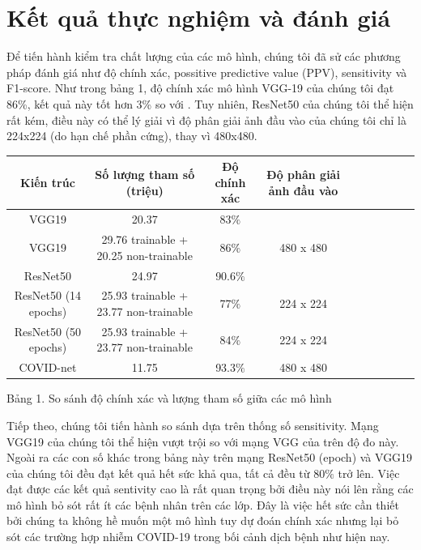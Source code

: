 \documentclass{article}
\begin{document}
\section{Kết quả thực nghiệm và đánh giá}
Để tiến hành kiểm tra chất lượng của các mô hình, chúng tôi đã sử các phương pháp đánh giá như độ chính xác, possitive predictive value (PPV), sensitivity và F1-score. Như trong bảng 1, độ chính xác mô hình VGG-19 của chúng tôi đạt 86\%, kết quả này tốt hơn 3\% so với \cite{covidxdataset}. Tuy nhiên, ResNet50 của chúng tôi thể hiện rất kém, điều này có thể lý giải vì độ phân giải ảnh đầu vào của chúng tôi chỉ là 224x224 (do hạn chế phần cứng), thay vì 480x480. 
\begin{center}
        \begin{tabular}{|c|c| c|c| c|c| c|c| c|c|}
        \hline
            Kiến trúc & Số lượng tham số (triệu) & Độ chính xác & Độ phân giải ảnh đầu vào\\
            \hline
            VGG19 \cite{covidxdataset} & 20.37 & 83$\%$ & \\
            \hline
            VGG19 & 29.76 trainable + 20.25 non-trainable & 86$\%$ & 480 x 480\\
            \hline
            ResNet50 \cite{covidxdataset} & 24.97 & 90.6$\%$ & \\
            \hline
            ResNet50 (14 epochs) & 25.93 trainable + 23.77 non-trainable & 77$\%$ & 224 x 224\\
            \hline
            ResNet50 (50 epochs) & 25.93 trainable + 23.77 non-trainable & 84$\%$ & 224 x 224 \\
            \hline
            COVID-net \cite{covidxdataset} & 11.75 & 93.3$\%$ & 480 x 480\\
        \hline 
        \end{tabular}
    \end{center}
\begin{center}
    Bảng 1. So sánh độ chính xác và lượng tham số giữa các mô hình 
\end{center}
Tiếp theo, chúng tôi tiến hành so sánh dựa trên thống số sensitivity. Mạng VGG19 của chúng tôi thể hiện vượt trội so với mạng VGG của \cite{covidxdataset} trên độ đo này. Ngoài ra các con số khác trong bảng này trên mạng ResNet50 (epoch) và VGG19 của chúng tôi đều đạt kết quả hết sức khả qua, tất cả đều từ 80$\%$ trở lên. Việc đạt được các kết quả sentivity cao là rất quan trọng bởi điều này nói lên rằng các mô hình bỏ sót rất ít các bệnh nhân trên các lớp. Đây là việc hết sức cần thiết bởi chúng ta không hề muốn một mô hình tuy dự đoán chính xác nhưng lại bỏ sót các trường hợp nhiễm COVID-19 trong bối cảnh dịch bệnh như hiện nay.
\end{document}
